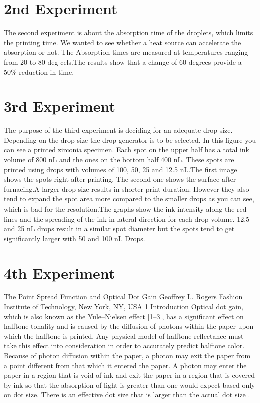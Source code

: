 \section{2nd Experiment}
The second experiment is about the absorption time of the droplets, which limits the printing time. We wanted to see whether a heat source can accelerate the absorption or not.
The Absorption times are measured at temperatures ranging from 20 to 80 deg cels.The results show that a change of 60 degrees provide a 50\% reduction in time.

\section{3rd Experiment}
The purpose of the third experiment is deciding for an adequate drop size. Depending on the drop size the drop generator is to be selected. In this figure you can see a printed zirconia specimen. Each spot on the upper half has a total ink volume of 800 nL and the ones on the bottom half 400 nL. These spots are printed using drops with volumes of 100, 50, 25 and 12.5 nL.The first image shows the spots right after printing. The second one shows the surface after furnacing.A larger drop size results in shorter print duration. However they also tend to expand the spot area more compared to the smaller drops as you can see, which is bad for the resolution.The graphs show the ink intensity along the red lines and the spreading of the ink in lateral direction for each drop volume. 12.5 and 25 nL drops result in a similar spot diameter but the spots tend to get significantly larger with 50 and 100 nL Drops.
\section{4th Experiment}

The Point Spread Function and
Optical Dot Gain
Geoffrey L. Rogers
Fashion Institute of Technology, New York, NY, USA
1  Introduction
Optical dot gain, which is also known as the Yule–Nielsen effect [1–3], has a significant
effect on halftone tonality and is caused by the diffusion of photons within the paper upon
which the halftone is printed. Any physical model of halftone reflectance must take this effect
into consideration in order to accurately predict halftone color.
Because of photon diffusion within the paper, a photon may exit the paper from a point
different from that which it entered the paper. A photon may enter the paper in a region that is
void of ink and exit the paper in a region that is covered by ink so that the absorption of light
is greater than one would expect based only on dot size. There is an effective dot size that is
larger than the actual dot size \citep{rogers2015point}.




